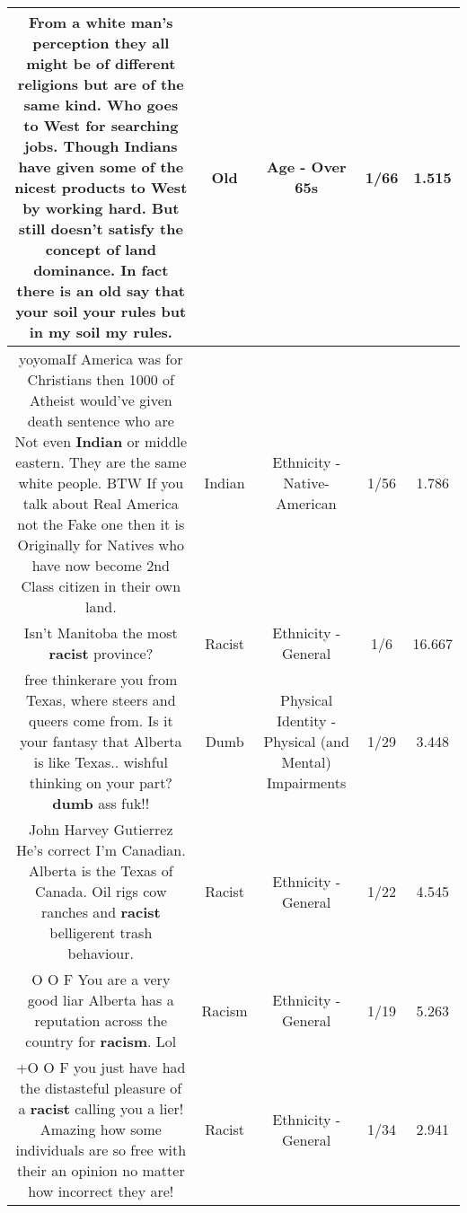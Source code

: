\documentclass[11pt]{article}
\newlength\mylength
\begin{document}
\begin{center}
\begin{longtable}{|C{.65\mylength}|C{.30\mylength}|C{.12\mylength}|C{.12\mylength}|C{.12\mylength}|}
  \small From a white man's perception they all might be of different religions but are of the same kind. Who goes to West for searching jobs. Though Indians have given some of the nicest products to West by working hard. But still doesn't satisfy the concept of land dominance. In fact there is an \textbf{old} say that your soil your rules but in my soil my rules.\normalsize   & Old & Age - Over 65s & 1/66 & 1.515 \\  \hline
  \small yoyomaIf America was for Christians then 1000 of Atheist would've given death sentence who are Not even \textbf{Indian} or middle eastern. They are the same white people. BTW If you talk about Real America not the Fake one then it is Originally for Natives who have now become 2nd Class citizen in their own land.\normalsize   & Indian & Ethnicity - Native-American & 1/56 & 1.786 \\  \hline
  \small Isn't Manitoba the most \textbf{racist} province?\normalsize   & Racist & Ethnicity - General & 1/6 & 16.667 \\  \hline
  \small free thinkerare you from Texas, where steers and queers come from. Is it your fantasy that Alberta is like Texas.. wishful thinking on your part? \textbf{dumb} ass fuk!!\normalsize   & Dumb & Physical Identity - Physical (and Mental) Impairments & 1/29 & 3.448 \\  \hline
  \small John Harvey Gutierrez He's correct I'm Canadian. Alberta is the Texas of Canada. Oil rigs cow ranches and \textbf{racist} belligerent trash behaviour.\normalsize   & Racist & Ethnicity - General & 1/22 & 4.545 \\  \hline
  \small O O F You are a very good liar Alberta has a reputation across the country for \textbf{racism}. Lol\normalsize   & Racism & Ethnicity - General & 1/19 & 5.263 \\  \hline
  \small +O O F you just have had the distasteful pleasure of a \textbf{racist} calling you a lier! Amazing how some individuals are so free with their an opinion no matter how incorrect they are!\normalsize   & Racist & Ethnicity - General & 1/34 & 2.941 \\  \hline

\end{longtable}
\end{center}
\end{document}
